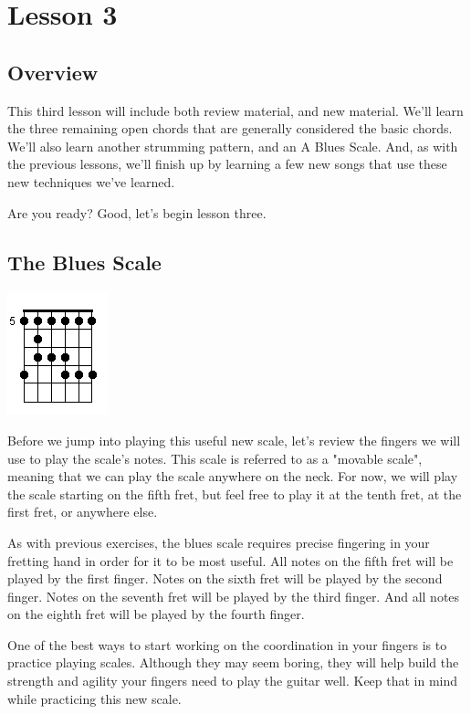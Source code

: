 \chapter{Lesson 3}
\section{Overview}
This third lesson will include both review material, and new material. We'll
learn the three remaining open chords that are generally considered the basic
chords. We'll also learn another strumming pattern, and an A Blues Scale. And,
as with the previous lessons, we'll finish up by learning a few new songs that
use these new techniques we've learned.

Are you ready? Good, let's begin lesson three.

\section{The Blues Scale}
\includegraphics{partthree/bluesscale.png}

Before we jump into playing this useful new scale, let's review the fingers we
will use to play the scale's notes. This scale is referred to as a "movable
scale", meaning that we can play the scale anywhere on the neck. For now, we
will play the scale starting on the fifth fret, but feel free to play it at the
tenth fret, at the first fret, or anywhere else.

As with previous exercises, the blues scale requires precise fingering in your
fretting hand in order for it to be most useful. All notes on the fifth fret
will be played by the first finger. Notes on the sixth fret will be played by
the second finger. Notes on the seventh fret will be played by the third
finger. And all notes on the eighth fret will be played by the fourth finger.

One of the best ways to start working on the coordination in your fingers is to
practice playing scales. Although they may seem boring, they will help build
the strength and agility your fingers need to play the guitar well. Keep that
in mind while practicing this new scale.

